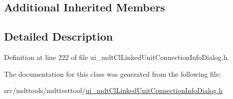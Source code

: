 \subsection*{Additional Inherited Members}


\subsection{Detailed Description}


Definition at line 222 of file ui\-\_\-mdt\-Cl\-Linked\-Unit\-Connection\-Info\-Dialog.\-h.



The documentation for this class was generated from the following file\-:\begin{DoxyCompactItemize}
\item 
src/mdttools/mdttesttool/\hyperlink{ui__mdt_cl_linked_unit_connection_info_dialog_8h}{ui\-\_\-mdt\-Cl\-Linked\-Unit\-Connection\-Info\-Dialog.\-h}\end{DoxyCompactItemize}

